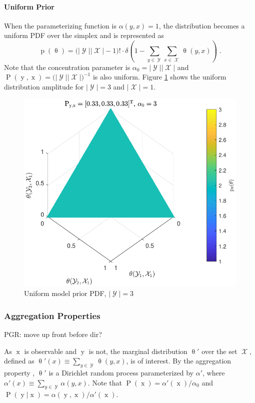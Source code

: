 \documentclass[12pt]{report}
\DeclareMathOperator{\xrm}{\mathrm{x}}
\DeclareMathOperator{\yrm}{\mathrm{y}}
\DeclareMathOperator{\Prm}{\mathrm{P}}
\DeclareMathOperator{\prm}{\mathrm{p}}
\DeclareMathOperator{\Xcal}{\mathcal{X}}
\DeclareMathOperator{\Ycal}{\mathcal{Y}}
\begin{document}
\paragraph{Uniform Prior}

When the parameterizing function is $\alpha(y,x) = 1$, the distribution becomes a uniform PDF over the simplex and is represented as
\begin{equation}
\prm(\uptheta) = \big( |\Ycal||\Xcal|-1 \big)! \cdot \delta \left( 1 - \sum_{y \in \Ycal} \sum_{x \in \Xcal}  \uptheta(y,x) \right) \;.
\end{equation}
Note that the concentration parameter is $\alpha_0 = |\Ycal||\Xcal|$ and $\Prm(\yrm,\xrm) = \big( |\Ycal||\Xcal| \big)^{-1}$ is also uniform. Figure \ref{fig:P_theta_uniform} shows the uniform distribution amplitude for $|\Ycal| = 3$ and $|\Xcal| = 1$.

\begin{figure}
\centering
\includegraphics[width=0.8\linewidth]{P_theta_uniform.pdf}
\caption{Uniform model prior PDF, $|\Ycal| = 3$}
\label{fig:P_theta_uniform}
\end{figure}



\subsubsection{Aggregation Properties}

PGR: move up front before dir?

As $\xrm$ is observable and $\yrm$ is not, the marginal distribution $\uptheta'$ over the set $\Xcal$, defined as $\uptheta'(x) \equiv \sum_{y \in \Ycal} \uptheta(y,x)$, is of interest. By the aggregation property \cite{ferguson}, $\uptheta'$ is a Dirichlet random process parameterized by $\alpha'$, where $\alpha'(x) \equiv \sum_{y \in \Ycal} \alpha(y,x)$. Note that $\Prm(\xrm) = \alpha'(\xrm) / \alpha_0$ and $\Prm(\yrm|\xrm) = \alpha(\yrm,\xrm) / \alpha'(\xrm)$. 
\end{document}
